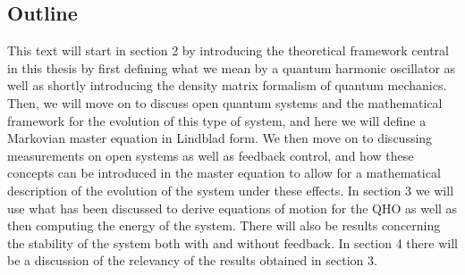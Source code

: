 \subsection{Outline}
This text will start in section 2 by introducing the theoretical framework central in this thesis by first defining what we mean by a quantum harmonic oscillator as well as shortly introducing the density matrix formalism of quantum mechanics. Then, we will move on to discuss open quantum systems and the mathematical framework for the evolution of this type of system, and here we will define a Markovian master equation in Lindblad form. We then move on to discussing measurements on open systems as well as feedback control, and how these concepts can be introduced in the master equation to allow for a mathematical description of the evolution of the system under these effects. In section 3 we will use what has been discussed to derive equations of motion for the QHO as well as then computing the energy of the system. There will also be results concerning the stability of the system both with and without feedback. In section 4 there will be a discussion of the relevancy of the results obtained in section 3.



